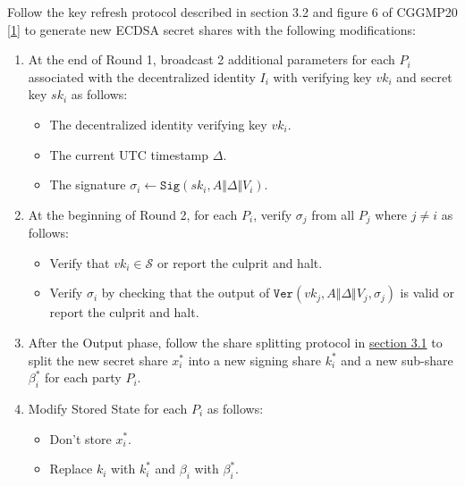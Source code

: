 \documentclass[
]{article}
\providecommand{\tightlist}{%
  \setlength{\itemsep}{0pt}\setlength{\parskip}{0pt}}
\begin{document}
Follow the key refresh protocol described in section 3.2 and figure 6 of
CGGMP20 {[}\protect\hyperlink{ref-cggmp20}{1}{]} to generate new ECDSA
secret shares with the following modifications:

\begin{enumerate}
\def\labelenumi{\arabic{enumi}.}
\tightlist
\item
  At the end of Round 1, broadcast 2 additional parameters for each
  \(P_i\) associated with the decentralized identity \(I_i\) with
  verifying key \(vk_i\) and secret key \(sk_i\) as follows:

  \begin{itemize}
  \tightlist
  \item
    The decentralized identity verifying key \(vk_i\).
  \item
    The current UTC timestamp \(\Delta\).
  \item
    The signature
    \(\sigma _i \leftarrow \mathtt{Sig}(sk_i, A \Vert \Delta \Vert V_i)\).
  \end{itemize}
\item
  At the beginning of Round 2, for each \(P_i\), verify \(\sigma _j\)
  from all \(P_j\) where \(j \neq i\) as follows:

  \begin{itemize}
  \tightlist
  \item
    Verify that \(vk_i \in \mathcal{S}\) or report the culprit and halt.
  \item
    Verify \(\sigma _i\) by checking that the output of
    \(\mathtt{Ver}(vk_j, A \Vert \Delta \Vert V_j, \sigma _j)\) is valid
    or report the culprit and halt.
  \end{itemize}
\item
  After the Output phase, follow the share splitting protocol in
  \protect\hyperlink{share-splitting}{section 3.1} to split the new
  secret share \(x_i^\ast\) into a new signing share \(k_i^\ast\) and a
  new sub-share \(\beta _i^\ast\) for each party \(P_i\).
\item
  Modify Stored State for each \(P_i\) as follows:

  \begin{itemize}
  \tightlist
  \item
    Don't store \(x_i^\ast\).
  \item
    Replace \(k_i\) with \(k_i^\ast\) and \(\beta _i\) with
    \(\beta _i^\ast\).
  \end{itemize}
\end{enumerate}
\end{document}
